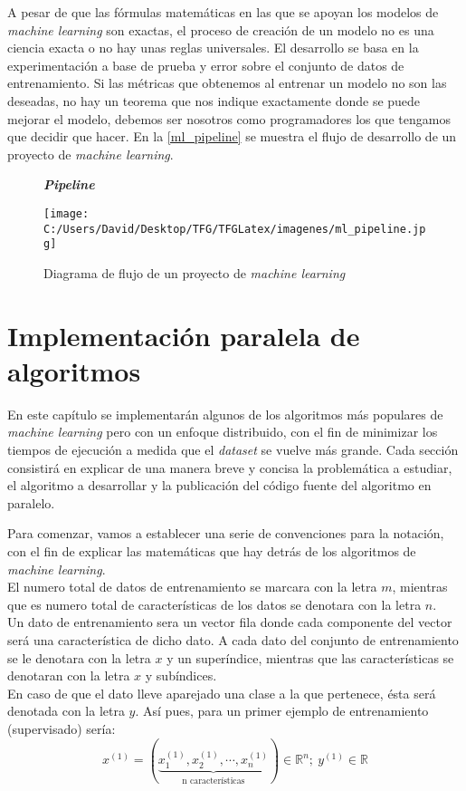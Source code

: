 A pesar de que las fórmulas matemáticas en las que se apoyan los modelos de \textit{machine learning} son
exactas, el proceso de creación de un modelo no es una ciencia exacta o no hay unas reglas universales. 
El desarrollo se basa en la experimentación a base de prueba y error sobre el conjunto de datos de entrenamiento.
Si las métricas que obtenemos al entrenar un modelo no son las deseadas, no hay un teorema que nos indique
exactamente donde se puede mejorar el modelo, debemos ser nosotros como programadores los que tengamos que
decidir que hacer.\hfill \break
En la \autoref{ml_pipeline} se muestra el flujo de desarrollo de un proyecto de \textit{machine learning}.

\begin{figure}[h]
  \centering
  \textbf{\textbf{\textit{Pipeline}}}\par\medskip
  \texttt{[image: C:/Users/David/Desktop/TFG/TFGLatex/imagenes/ml\_pipeline.jpg]}
  \caption[\textit{Machine learning pipeline}]{Diagrama de flujo de un proyecto de \textit{machine learning}}
  \label{ml_pipeline}
\end{figure}

\clearpage


\chapter[Implementación paralela]{Implementación paralela de algoritmos}\label{chap:implementacion_paralela}
En este capítulo se implementarán algunos de los algoritmos más populares de \textit{machine learning} 
pero con un enfoque distribuido, con el fin de minimizar los tiempos de ejecución a medida que
el \textit{dataset} se vuelve más grande.
Cada sección consistirá en explicar de una manera breve y concisa la problemática a estudiar, 
el algoritmo a desarrollar y la publicación del código fuente del algoritmo en paralelo.
\newline

Para comenzar, vamos a establecer una serie de convenciones para la notación, con el fin de explicar
las matemáticas que hay detrás de los algoritmos de \textit{machine learning}.\\
El numero total de datos de entrenamiento se marcara con la letra $m$, mientras que es numero total
de características de los datos se denotara con la letra $n$.\\
Un dato de entrenamiento sera un vector fila donde cada componente del vector será una característica
de dicho dato. A cada dato del conjunto de entrenamiento se le denotara con la letra $x$ y un 
superíndice, mientras que las características se denotaran con la letra $x$ y subíndices.\\ 
En caso de que el dato lleve aparejado una clase a la que pertenece, ésta será denotada con la letra 
$y$. Así pues, para un primer ejemplo de entrenamiento (supervisado) sería:
$$ x^{(1)}=(\underbrace{x^{(1)}_1, x^{(1)}_2, \cdots, x^{(1)}_n}_{\text{n características}}) \in \mathds{R}^n; \>
   y^{(1)} \in \mathds{R} $$

